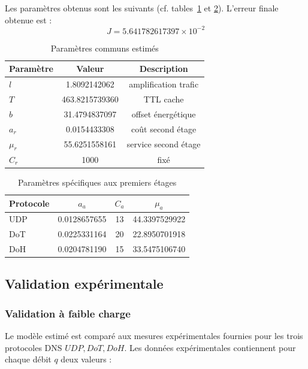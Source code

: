 \documentclass[12pt, a4paper]{report}
\begin{document}
	\noindent Les paramètres obtenus sont les suivants (cf. tables~\ref{param1} et \ref{param2}).
	L'erreur finale obtenue est :
	\[
	\boxed{
	J=5.641782617397\times10^{-2}
	}
	\]



	\begin{table}[h]
	\centering
	\begin{tabular}{lcc}
	\toprule
	Paramètre & Valeur & Description\\
	\midrule
	$l$ & 1.8092142062 & amplification trafic\\
	$T$ & 463.8215739360 & TTL cache\\
	$b$ & 31.4794837097 & offset énergétique\\
	$a_r$ & 0.0154433308 & coût second étage\\
	$\mu_r$ & 55.6251558161 & service second étage\\
	$C_r$ & 1000 & fixé\\
	\bottomrule
	\end{tabular}
	\caption{Paramètres communs estimés}
		\label{param1}
	\end{table}



	\begin{table}[h]
	\centering
	\begin{tabular}{lccc}
	\toprule
	Protocole & $a_a$ & $C_a$ & $\mu_a$\\
	\midrule
	UDP
	&0.0128657655&13&44.3397529922\\

	DoT
	&0.0225331164&20&22.8950701918\\

	DoH
	&0.0204781190&15&33.5475106740\\
	\bottomrule
	\end{tabular}

	\caption{Paramètres spécifiques aux premiers étages}
		\label{param2}
	\end{table}

	\subsection{Validation expérimentale}
	\subsubsection{Validation à faible charge}


	\noindent Le modèle estimé est comparé aux mesures expérimentales fournies pour
	les trois protocoles DNS $UDP, DoT, DoH$. Les données expérimentales contiennent pour chaque débit $q$ deux
	valeurs :\\
\end{document}
